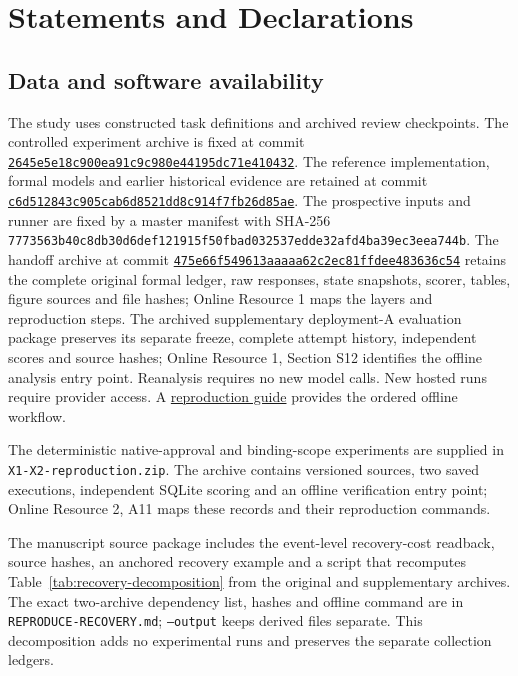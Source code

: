 \section*{Statements and Declarations}
\subsection*{Data and software availability}
The study uses constructed task definitions and archived review checkpoints. The controlled experiment archive is fixed at commit \href{https://github.com/lhh666-6/auto-dete/tree/2645e5e18c900ea91c9c980e44195dc71e410432/DKE-supplement}{\nolinkurl{2645e5e18c900ea91c9c980e44195dc71e410432}}. The reference implementation, formal models and earlier historical evidence are retained at commit \href{https://github.com/lhh666-6/auto-dete/tree/c6d512843c905cab6d8521dd8c914f7fb26d85ae/latest}{\nolinkurl{c6d512843c905cab6d8521dd8c914f7fb26d85ae}}. The prospective inputs and runner are fixed by a master manifest with SHA-256 \nolinkurl{7773563b40c8db30d6def121915f50fbad032537edde32afd4ba39ec3eea744b}. The handoff archive at commit \href{https://github.com/lhh666-6/auto-dete/tree/475e66f549613aaaaa62c2ec81ffdee483636c54/cloud-handoff}{\nolinkurl{475e66f549613aaaaa62c2ec81ffdee483636c54}} retains the complete original formal ledger, raw responses, state snapshots, scorer, tables, figure sources and file hashes; Online Resource 1 maps the layers and reproduction steps. The archived supplementary deployment-A evaluation package preserves its separate freeze, complete attempt history, independent scores and source hashes; Online Resource 1, Section S12 identifies the offline analysis entry point. Reanalysis requires no new model calls. New hosted runs require provider access. A \href{https://github.com/lhh666-6/auto-dete/blob/f5fe7231c5e808ba1629132d222f448bff471204/REPRODUCIBILITY.md}{reproduction guide} provides the ordered offline workflow. 

The deterministic native-approval and binding-scope experiments are supplied in \texttt{X1-X2-reproduction.zip}. The archive contains versioned sources, two saved executions, independent SQLite scoring and an offline verification entry point; Online Resource 2, A11 maps these records and their reproduction commands.

The manuscript source package includes the event-level recovery-cost readback, source hashes, an anchored recovery example and a script that recomputes Table~\ref{tab:recovery-decomposition} from the original and supplementary archives. The exact two-archive dependency list, hashes and offline command are in \texttt{REPRODUCE-RECOVERY.md}; \texttt{--output} keeps derived files separate. This decomposition adds no experimental runs and preserves the separate collection ledgers.


